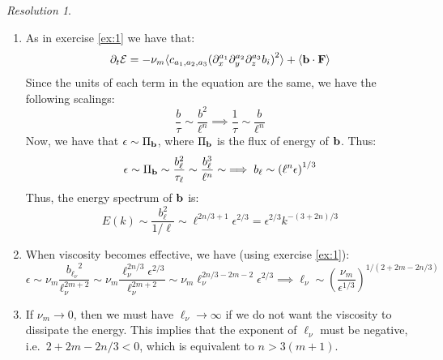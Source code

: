 \documentclass[10pt,a4paper]{article}
\theoremstyle{definition}
\theoremstyle{remark}
\newtheorem*{res}{Resolution}
\begin{document}
\begin{res}\hfill
  \begin{enumerate}
    \item As in exercise \ref{ex:1} we have that:
          $$
            \partial_t \mathcal{E} = -\nu_m \langle c_{a_1,a_2,a_3}{(\partial_x^{a_1} \partial_y^{a_2} \partial_z^{a_3} b_i)}^2 \rangle + \langle \boldsymbol{\mathrm{b}} \cdot \boldsymbol{\mathrm{F}} \rangle
          $$
          Since the units of each term in the equation are the same, we have the following scalings:
          $$
            \frac{b}{\tau} \sim \frac{b^2}{\ell^n} \implies \frac{1}{\tau} \sim \frac{b}{\ell^n}
          $$
          Now, we have that $\epsilon\sim \Pi_{\boldsymbol{\mathrm{b}}}$, where $\Pi_{\boldsymbol{\mathrm{b}}}$ is the flux of energy of $\boldsymbol{\mathrm{b}}$. Thus:
          $$
            \epsilon\sim \Pi_{\boldsymbol{\mathrm{b}}}\sim \frac{b_\ell^2}{\tau_\ell} \sim \frac{b_\ell^3}{\ell^n} \sim \implies b_\ell \sim \left(\ell^{n}\epsilon\right)^{1/3}
          $$
          Thus, the energy spectrum of $\boldsymbol{\mathrm{b}}$ is:
          $$
            E(k) \sim \frac{b_\ell^2}{1/\ell} \sim \ell^{2n/3+1} \epsilon^{2/3}=\epsilon^{2/3} k^{-(3+2n)/3}
          $$
    \item When viscosity becomes effective, we have (using exercise \ref{ex:1}):
          $$
            \epsilon \sim \nu_m \frac{{b_{\ell_\nu}}^2}{\ell_\nu^{2m+2}}  \sim \nu_m \frac{\ell_\nu^{2n/3} \epsilon^{2/3}}{\ell_\nu^{2m+2}}  \sim \nu_m \ell_\nu^{2n/3-2m-2} \epsilon^{2/3}\implies \ell_\nu \sim \left(\frac{\nu_m}{\epsilon^{1/3}}\right)^{1/(2+2m-2n/3)}
          $$
    \item If $\nu_m \to 0$, then we must have $\ell_\nu \to \infty$ if we do not want the viscosity to dissipate the energy. This implies that the exponent of $\ell_\nu$ must be negative, i.e.\ $2+2m-2n/3<0$, which is equivalent to $n>3(m+1)$.
  \end{enumerate}
\end{res}
\end{document}
